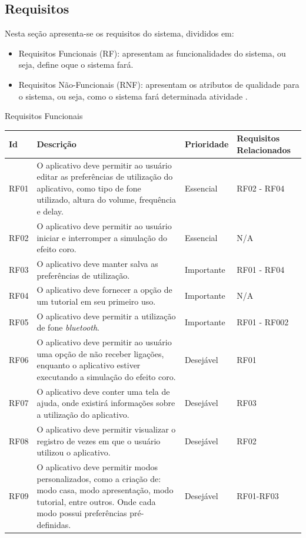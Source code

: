 \subsection{Requisitos}

Nesta se\c{c}\~ao apresenta-se os requisitos do sistema, divididos em:
\begin{itemize}
	
	\item  Requisitos Funcionais (RF): apresentam as funcionalidades do sistema, ou seja, define oque o sistema far\'a. 
	
	\item Requisitos N\~ao-Funcionais (RNF): apresentam os atributos de qualidade para o sistema, ou seja, como o sistema far\'a determinada atividade \cite{Ventura2016}. 
	
\end{itemize}

\begin{quadro}[!htb]
	\caption{Requisitos Funcionais}\label{quad:reqfuncionais}
	\centering
	\begin{tabular}{|p{1.0cm}|p{8.5cm}|p{2.0cm}|p{2.5cm}|}
		\hline
		\textbf{Id} & \textbf{Descri\c{c}\~ao} & \textbf{Prioridade} & \textbf{Requisitos Relacionados}\\
		\hline
		RF01 & O aplicativo deve permitir ao usu\'ario editar as prefer\^encias de utiliza\c{c}\~ao do aplicativo, como tipo de fone utilizado, altura do volume, frequ\^encia e delay. & Essencial & RF02 - RF04\\
		\hline
		RF02 & O aplicativo deve permitir ao usu\'ario iniciar e interromper a simula\c{c}\~ao do efeito coro. & Essencial & N/A \\
		\hline
		RF03 & O aplicativo deve manter salva as prefer\^encias de utiliza\c{c}\~ao. & Importante & RF01 - RF04\\
		\hline
		RF04 & O aplicativo deve fornecer a op\c{c}\~ao de um tutorial em seu primeiro uso. & Importante & N/A\\
		\hline
		RF05 & O aplicativo deve permitir a utiliza\c{c}\~ao de fone \textit{bluetooth}. & Importante & RF01 - RF002\\
		\hline
		RF06 & O aplicativo deve permitir ao usu\'ario uma op\c{c}\~ao de n\~ao receber liga\c{c}\~oes, enquanto o aplicativo estiver executando a simula\c{c}\~ao do efeito coro. & Desej\'avel & RF01\\
		\hline
		RF07 & O aplicativo deve conter uma tela de ajuda, onde existir\'a informa\c{c}\~oes sobre a utiliza\c{c}\~ao do aplicativo. & Desej\'avel & RF03\\
		\hline
		RF08 & O aplicativo deve permitir visualizar o registro de vezes em que o usu\'ario utilizou o aplicativo. & Desej\'avel & RF02\\
		\hline
		RF09 & O aplicativo deve permitir modos personalizados, como a cria\c{c}\~ao de: modo casa, modo apresenta\c{c}\~ao, modo tutorial, entre outros. Onde cada modo possui prefer\^encias pr\'e-definidas. & Desej\'avel & RF01-RF03\\
		\hline	
	\end{tabular}
\end{quadro}

